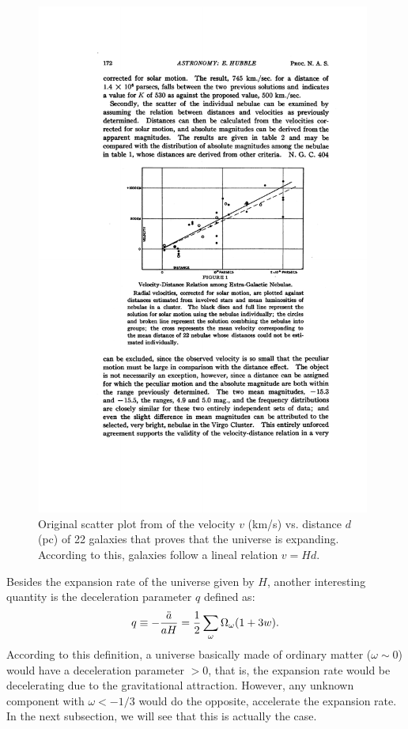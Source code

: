 \begin{figure}
\centering
\includegraphics[width=110mm]{./plots/Hubblediagram.pdf}
\caption{Original scatter plot from \citet{Hubble1929} of the velocity $v$ (km/s) vs. distance $d$ (pc) of 22 galaxies that proves that the universe is expanding. According to this, galaxies follow a lineal relation $v=Hd$.} 
\label{fig:hubble_diagram}
\end{figure}

Besides the expansion rate of the universe given by $H$, another interesting quantity is the deceleration parameter $q$ defined as:
\begin{equation}
q \equiv -{\ddot{a} \over aH} = {1 \over 2} \sum_\omega \Omega_{\omega}{(1+3w)}.
\label{eq:deceleration}
\end{equation} 
According to this definition, a universe basically made of ordinary matter ($\omega \sim 0$) would have a deceleration parameter $>0$, that is, the expansion rate would be decelerating due to the gravitational attraction. However, any unknown component with $\omega < -1/3$ would do the opposite, accelerate the expansion rate. In the next subsection, we will see that this is actually the case.


